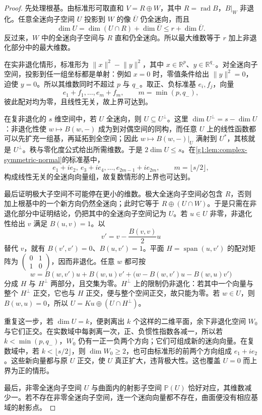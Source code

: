 \begin{proof}
	先处理根基。由标准形可取直和 \(V=R\oplus W\)，其中 \(R=\operatorname{rad}B\)，\(B|_W\) 非退化。任意全迷向子空间 \(U\) 投影到 \(W\) 的像 \(\overline U\) 仍全迷向，而且
	\[
		\dim U=\dim(U\cap R)+\dim\overline U
		\le r+\dim\overline U.
	\]
	反过来，\(W\) 中的全迷向子空间与 \(R\) 直和仍全迷向。所以最大维数等于 \(r\) 加上非退化部分中的最大维数。

	在实非退化情形，标准形为 \(\lVert x\rVert^2-\lVert y\rVert^2\)，其中 \(x\in\mathbb R^p\)、\(y\in\mathbb R^{q_-}\)。对全迷向子空间，投影到任一组坐标都是单射：例如 \(x=0\) 时，零值条件给出 \(\lVert y\rVert^2=0\)，迫使 \(y=0\)。所以其维数同时不超过 \(p\) 与 \(q_-\)。取正、负标准基 \(e_i,f_j\)，向量
	\[
		e_1+f_1,\ldots,e_m+f_m,
		\qquad m=\min(p,q_-),
	\]
	彼此配对均为零，且线性无关，故上界可达到。

	在复非退化的 \(s\) 维空间中，若 \(U\) 全迷向，则 \(U\subseteq U^\perp\)。这里 \(\dim U^\perp=s-\dim U\)：非退化性使 \(w\mapsto B(w,-)\) 成为到对偶空间的同构，而任意 \(U\) 上的线性函数都可以先扩充一组基，再延拓到全空间；因此 \(w\mapsto B(w,-)|_U\) 满射到 \(U^*\)，其核就是 \(U^\perp\)。秩与零化度公式给出所需维数。于是 \(2\dim U\le s\)。在\cref{g1:lem:complex-symmetric-normal}的标准基中，
	\[
		e_1+ie_2,\ e_3+ie_4,\ldots,
		e_{2m-1}+ie_{2m},\qquad m=\lfloor s/2\rfloor,
	\]
	构成线性无关的全迷向向量组，故复数情形的上界也可达到。

	最后证明极大子空间不可能停在更小的维数。极大全迷向子空间必包含 \(R\)，否则加上根基中的一个新方向仍然全迷向；此时它等于 \(R\oplus(U\cap W)\)。于是只需在非退化部分中证明结论，仍把其中的全迷向子空间记为 \(U\)。若 \(u\in U\) 非零，非退化性给出 \(v\) 满足 \(B(u,v)=1\)。以
	\[
		v'=v-\frac{B(v,v)}2u
	\]
	替代 \(v\)，就有 \(B(v',v')=0\)、\(B(u,v')=1\)。平面 \(H=\operatorname{span}(u,v')\) 的配对矩阵为 \(\left(\begin{smallmatrix}0&1\\1&0\end{smallmatrix}\right)\)，因而非退化。任意 \(w\) 都可按
	\[
		w=B(w,v')u+B(w,u)v'
		+\bigl(w-B(w,v')u-B(w,u)v'\bigr)
	\]
	分成 \(H\) 与 \(H^\perp\) 两部分，且交集为零。\(H^\perp\) 上的限制仍非退化：若其中一个向量与整个 \(H^\perp\) 正交，它也与 \(H\) 正交，便与整个空间正交，故只能为零。若 \(w\in U\)，则 \(B(w,u)=0\)，所以 \(U=Ku\oplus(U\cap H^\perp)\)。

	重复这一步，若 \(\dim U=k\)，便剥离出 \(k\) 个这样的二维平面，余下非退化空间 \(W_0\) 与它们正交。在实数域中每剥离一次，正、负惯性指数各减一，所以若 \(k<\min(p,q_-)\)，\(W_0\) 仍有一正一负两个方向；它们可组成新的迷向向量。在复数域中，若 \(k<\lfloor s/2\rfloor\)，则 \(\dim W_0\ge2\)，也可由标准形的前两个方向组成 \(e_1+ie_2\)。这些新向量都与原 \(U\) 正交，使 \(U\) 真正扩大，违背极大性。这也覆盖 \(U=0\) 而上界为正的情形。

	最后，非零全迷向子空间 \(U\) 与曲面内的射影子空间 \(\mathbb P(U)\) 恰好对应，其维数减少一。若不存在非零全迷向子空间，连一个迷向向量都不存在，曲面便没有相应基域的射影点。
\end{proof}


